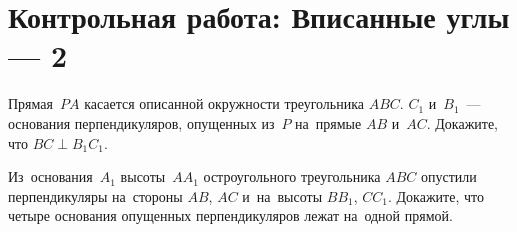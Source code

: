 
\section*{Контрольная работа: Вписанные углы --- 2}



\begin{problems}

\item
Прямая~$PA$ касается описанной окружности треугольника $ABC$.
$C_1$ и~$B_1$~--- основания перпендикуляров, опущенных из~$P$
на~прямые $AB$ и~$AC$.
Докажите, что $BC \perp B_1 C_1$.

\item
Из~основания~$A_1$ высоты~$A A_1$ остроугольного треугольника $ABC$ опустили
перпендикуляры на~стороны $AB$, $AC$ и~на~высоты $B B_1$, $C C_1$.
Докажите, что четыре основания опущенных перпендикуляров лежат на~одной прямой.

\end{problems}

